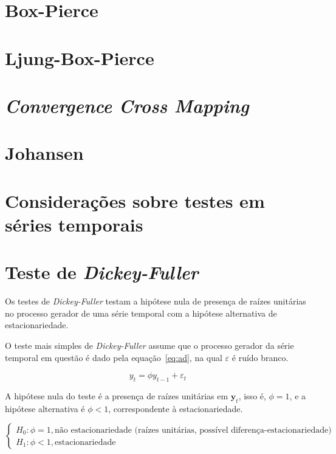 \section{Box-Pierce}

\section{Ljung-Box-Pierce}

\section{\emph{Convergence Cross Mapping}}

\section{Johansen}

\section{Considerações sobre testes em séries temporais}

\section{Teste de \emph{Dickey-Fuller}}

Os testes de \emph{Dickey-Fuller} testam a hipótese nula de presença de raízes
unitárias no processo gerador de uma série temporal com a hipótese alternativa
de estacionariedade.

O teste mais simples de \emph{Dickey-Fuller} assume que o processo gerador da
série temporal em questão é dado pela equação~\ref{eq:ad}, na qual
$\varepsilon$ é ruído branco.

\begin{equation}\label{eq:ad}
    y_t = \phi y_{t-1} + \varepsilon_t
\end{equation}

A hipótese nula do teste é a presença de raízes unitárias em $\mathbf{y}_t$,
isso é, $\phi = 1$, e a hipótese alternativa é $\phi < 1$, correspondente à
estacionariedade.

$$
\begin{cases}
    H_0: \phi = 1, \text{não estacionariedade (raízes unitárias, possível diferença-estacionariedade)} \\
    H_1: \phi < 1, \text{estacionariedade}
\end{cases}
$$

